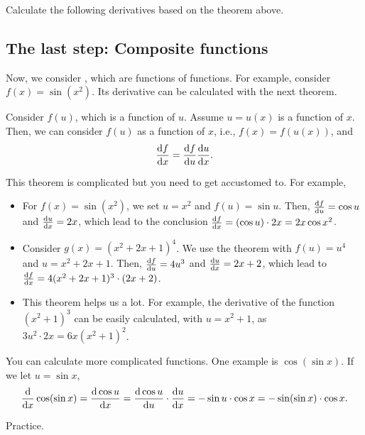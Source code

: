 \documentclass[11pt,pdfa,lastpage]{MishoNote}
\begin{document}
\begin{problems}
\Problem[S] Calculate the following derivatives based on the theorem above.
\begin{menumerate}{3}
\end{menumerate}
\end{problems}

\subsection{The last step: Composite functions}
Now, we consider , which are functions of functions. For example, consider $f(x)=\sin(x^2)$. Its derivative can be calculated with the next theorem.
\begin{theorem}{}{}
  Consider $f(u)$, which is a function of $u$. Assume $u=u(x)$ is a function of $x$. Then, we can consider $f(u)$ as a function of $x$, i.e., $f(x)=f(u(x))$, and
  \begin{equation}
   \diff{f}{x}=\diff{f}{u}\diff{u}{x}.
  \end{equation}
\end{theorem}
\noindent
This theorem is complicated but you need to get accustomed to. For example,
  \begin{itemize}
    \item For $f(x)=\sin(x^2)$, we set $u=x^2$ and $f(u)=\sin u$. Then, $\diff fu=\cos u$ and $\diff ux=2x$, which lead to the conclusion $\diff fx=(\cos u)\cdot2x=2x\cos x^2$.
    \item Consider $g(x)=(x^2+2x+1)^4$. We use the theorem with $f(u)=u^4$ and $u=x^2+2x+1$. Then, $\diff fu=4u^3$ and $\diff ux=2x+2$, which lead to $\diff fx=4(x^2+2x+1)^3\cdot(2x+2)$.
    \\
    \item This theorem helps us a lot. For example, the derivative of the function $(x^2+1)^3$ can be easily calculated, with $u=x^2+1$, as $3u^2\cdot 2x=6x(x^2+1)^2$.
  \end{itemize}
You can calculate more complicated functions. One example is $\cos(\sin x)$. If we let $u=\sin x$,
  \[
  \diff{}{x}\cos(\sin x)=\diff{\cos{u}}{x}=\diff{\cos{u}}{u}\cdot\diff ux=-\sin u\cdot\cos x=-\sin(\sin x)\cdot\cos x.
  \]

\begin{problems}
  \Problem[S] Practice.
  \begin{menumerate}{3}
  \end{menumerate}
\end{problems}
\end{document}
